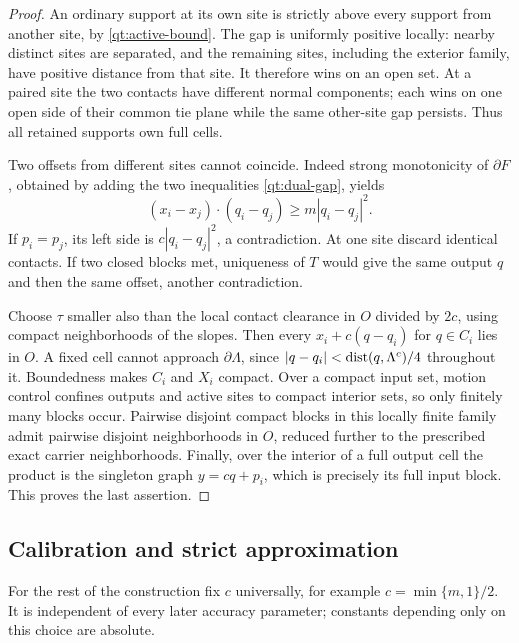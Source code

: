 \begin{proof}
An ordinary support at its own site is strictly above every support
from another site, by \eqref{qt:active-bound}.  The gap is uniformly
positive locally: nearby distinct sites are separated, and the
remaining sites, including the exterior family, have positive distance
from that site.  It therefore wins on an open set.  At a paired site
the two contacts have different normal components; each wins on one
open side of their common tie plane while the same other-site gap
persists.  Thus all retained supports own full cells.

Two offsets from different sites cannot coincide.  Indeed strong
monotonicity of $\partial F$, obtained by adding the two inequalities
\eqref{qt:dual-gap}, yields
\[
 (x_i-x_j)\cdot(q_i-q_j)\geq m|q_i-q_j|^2.
\]
If $p_i=p_j$, its left side is $c|q_i-q_j|^2$, a contradiction.
At one site discard identical contacts.  If two closed blocks met,
uniqueness of $T$ would give the same output $q$ and then the same
offset, another contradiction.

Choose $\tau$ smaller also than the local contact clearance in $O$
divided by $2c$, using compact neighborhoods of the slopes.
Then every $x_i+c(q-q_i)$ for $q\in C_i$ lies in $O$.  A fixed cell
cannot approach $\partial\Lambda$, since
$|q-q_i|<\operatorname{dist}(q,\Lambda^c)/4$ throughout it.  Boundedness makes $C_i$
and $X_i$ compact.  Over a compact input set, motion control confines
outputs and active sites to compact interior sets, so only finitely
many blocks occur.  Pairwise disjoint compact blocks in this locally
finite family admit pairwise disjoint neighborhoods in $O$, reduced
further to the prescribed exact carrier neighborhoods.  Finally, over
the interior of a full output cell the product is the singleton graph
$y=cq+p_i$, which is precisely its full input block.  This proves the
last assertion.
\end{proof}

\subsection{Calibration and strict approximation}

For the rest of the construction fix $c$ universally, for example
$c=\min\{m,1\}/2$.  It is independent of every later accuracy
parameter; constants depending only on this choice are absolute.

